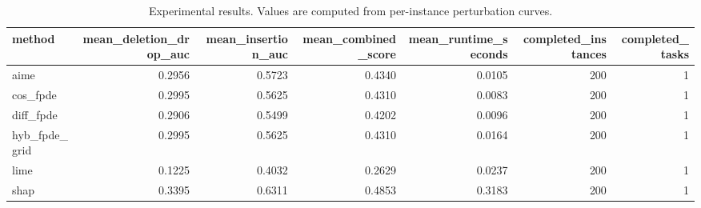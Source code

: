 \begin{table}[t]
\caption{Experimental results. Values are computed from per-instance perturbation curves.}
\label{tab:main_results_computed}
\centering
\begin{tabular}{lrrrrrr}
\toprule
method & mean\_deletion\_drop\_auc & mean\_insertion\_auc & mean\_combined\_score & mean\_runtime\_seconds & completed\_instances & completed\_tasks \\
\midrule
aime & 0.2956 & 0.5723 & 0.4340 & 0.0105 & 200 & 1 \\
cos\_fpde & 0.2995 & 0.5625 & 0.4310 & 0.0083 & 200 & 1 \\
diff\_fpde & 0.2906 & 0.5499 & 0.4202 & 0.0096 & 200 & 1 \\
hyb\_fpde\_grid & 0.2995 & 0.5625 & 0.4310 & 0.0164 & 200 & 1 \\
lime & 0.1225 & 0.4032 & 0.2629 & 0.0237 & 200 & 1 \\
shap & 0.3395 & 0.6311 & 0.4853 & 0.3183 & 200 & 1 \\
\bottomrule
\end{tabular}

\end{table}
